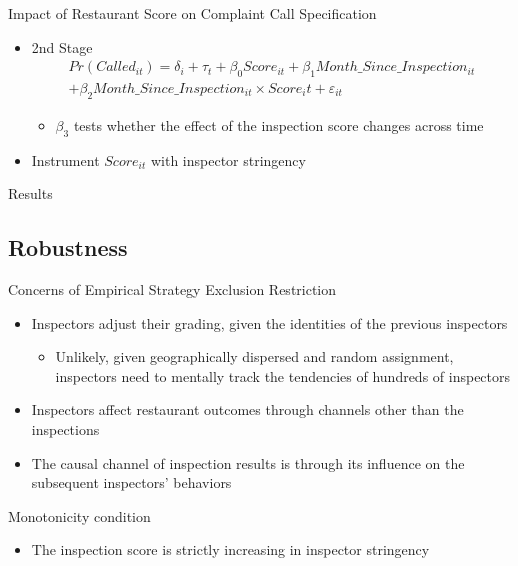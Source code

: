 \documentclass{beamer}
\begin{document}
\begin{frame}{Impact of Restaurant Score on Complaint Call Specification}
\begin{itemize}
\item 2nd Stage
\begin{align*}
    Pr(Called_{it}) = \delta_i + \tau_t + \beta_0 Score_{it} + \beta_1 Month\_Since\_Inspection_{it} \\
    + \beta_2 Month\_Since\_Inspection_{it} \times Score_it + \varepsilon_{it}
\end{align*}
\begin{itemize}
\item $\beta_3$ tests whether the effect of the inspection score changes across time
\end{itemize}
\item Instrument $Score_{it}$ with inspector stringency
\end{itemize}
\end{frame}

\begin{frame}{Results}
\begin{table}
\scalebox{0.5}{}
\end{table}
\end{frame}

\subsection{Robustness}
\begin{frame}{Concerns of Empirical Strategy}
Exclusion Restriction
\begin{itemize}
\item Inspectors adjust their grading, given the identities of the previous inspectors
\begin{itemize}
\item Unlikely, given geographically dispersed and random assignment, inspectors need to mentally track the tendencies of hundreds of inspectors
\end{itemize}
\item Inspectors affect restaurant outcomes through channels other than the inspections
\item The causal channel of inspection results is through its influence on the subsequent inspectors' behaviors
\end{itemize}
\pause
Monotonicity condition
\begin{itemize}
    \item The inspection score is strictly increasing in inspector stringency
\end{itemize}
\end{frame}
\end{document}
